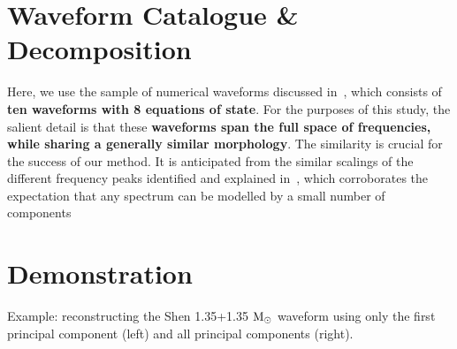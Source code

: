 \documentclass[a0,landscape]{a0poster}
\newcommand{\matr}[1]{\mathbf{#1}}
\begin{document}
\begin{multicols}{4}
\section*{\centering Waveform Catalogue \& Decomposition}
Here, we use the sample of numerical waveforms discussed
in~\cite{2014PhRvD..90f2004C},  which consists of {\bf ten waveforms with 8
equations of state}.  For the purposes of this study, the salient detail is that
these {\bf waveforms span the full space of frequencies, while sharing a
generally similar morphology}.  The similarity is crucial for the success of our
method. It is anticipated from the similar scalings of the different frequency
peaks identified and explained in~\cite{2015arXiv150203176B}, which
corroborates the expectation that any spectrum can be modelled by a small number
of components




\section*{\centering Demonstration}
\begin{minipage}{\columnwidth}
\makeatletter
\newcommand{\@captype}{figure}
\makeatother
\centering
{}\qquad%
\caption{Example: reconstructing the Shen 1.35+1.35 ${\rm M}_{\odot}$ waveform
using only the first principal component (left) and all principal components
(right). \label{fig:example}}
\end{minipage}


\end{multicols}
\end{document}
